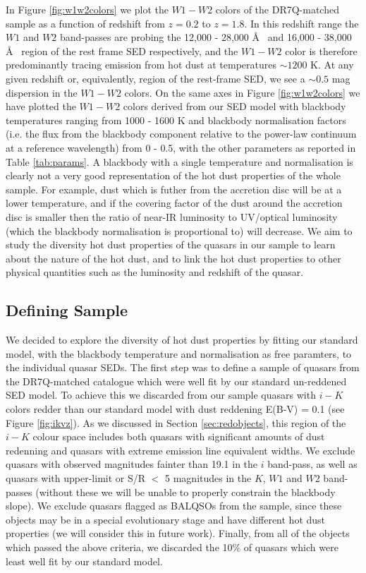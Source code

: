 In Figure \ref{fig:w1w2colors} we plot the $W1 - W2$ colors of the DR7Q-matched sample as a function of redshift from $z=0.2$ to $z=1.8$. 
In this redshift range the $W1$ and $W2$ band-passes are probing the 12,000 - 28,000 \AA~ and 16,000 - 38,000 \AA~ region of the rest frame SED respectively, and the $W1-W2$ color is therefore predominantly tracing emission from hot dust at temperatures $\sim 1200$ K. At any given redshift or, equivalently, region of the rest-frame SED, we see a $\sim 0.5$ mag dispersion in the $W1-W2$ colors. On the same axes in Figure \ref{fig:w1w2colors} we have plotted the $W1 - W2$ colors derived from our SED model with blackbody temperatures ranging from 1000 - 1600 K and blackbody normalisation factors (i.e. the flux from the blackbody component relative to the power-law continuum at a reference wavelength) from 0 - 0.5, with the other parameters as reported in Table \ref{tab:params}. A blackbody with a single temperature and normalisation is clearly not a very good representation of the hot dust properties of the whole sample. For example, dust which is futher from the accretion disc will be at a lower temperature, and if the covering factor of the dust around the accretion disc is smaller then the ratio of near-IR luminosity to UV/optical luminosity (which the blackbody normalisation is proportional to) will decrease. We aim to study the diversity hot dust properties of the quasars in our sample to learn about the nature of the hot dust, and to link the hot dust properties to other physical quantities such as the luminosity and redshift of the quasar. 

\subsection{Defining Sample}
\label{sec:definingsample}

We decided to explore the diversity of hot dust properties by fitting our standard model, with the blackbody temperature and normalisation as free paramters, to the individual quasar SEDs. The first step was to define a sample of quasars from the DR7Q-matched catalogue which were well fit by our standard un-reddened SED model. To achieve this we discarded from our sample quasars with $i - K$ colors redder than our standard model with dust reddening E(B-V) = 0.1 (see Figure \ref{fig:ikvz}). As we discussed in Section \ref{sec:redobjects}, this region of the $i-K$ colour space includes both quasars with significant amounts of dust redenning and quasars with extreme emission line equivalent widths. We exclude quasars with observed magnitudes fainter than 19.1 in the $i$ band-pass, as well as quasars with upper-limit or S/R $<$ 5 magnitudes in the $K$, $W1$ and $W2$ band-passes (without these we will be unable to properly constrain the blackbody slope). We exclude quasars flagged as BALQSOs from the sample, since these objects may be in a special evolutionary stage and have different hot dust properties (we will consider this in future work). Finally, from all of the objects which passed the above criteria, we discarded the 10\% of quasars which were least well fit by our standard model.   

